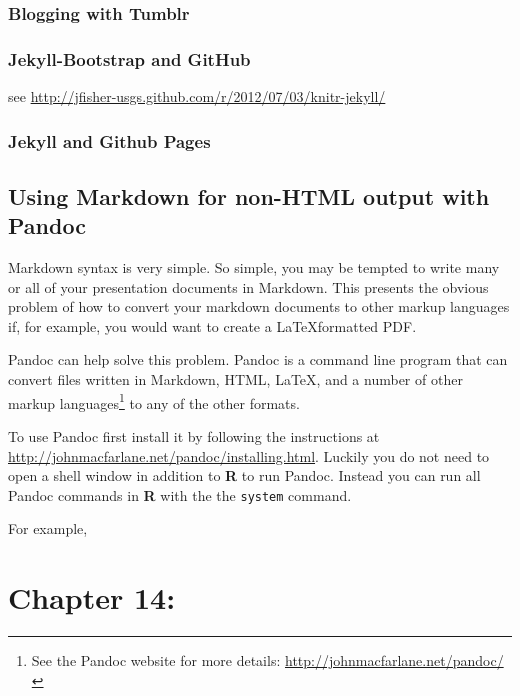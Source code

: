 \documentclass[ChapterTOCs,krantz1]{krantz}\usepackage{graphicx, color}
\begin{document}
\subsection{Blogging with Tumblr}

\subsection{Jekyll-Bootstrap and GitHub}

see \url{http://jfisher-usgs.github.com/r/2012/07/03/knitr-jekyll/}

\subsection{Jekyll and Github Pages}

\section{Using Markdown for non-HTML output with Pandoc}

Markdown syntax is very simple. So simple, you may be tempted to write many or all of your presentation documents in Markdown. This presents the obvious problem of how to convert your markdown documents to other markup languages if, for example, you would want to create a \LaTeX formatted PDF. 

Pandoc can help solve this problem. Pandoc is a command line program that can convert files written in Markdown, HTML, \LaTeX, and a number of other markup languages\footnote{See the Pandoc website for more details: {\url{http://johnmacfarlane.net/pandoc/}}} to any of the other formats. 

To use Pandoc first install it by following the instructions at {\url{http://johnmacfarlane.net/pandoc/installing.html}}. Luckily you do not need to open a shell window in addition to {\bf{R}} to run Pandoc. Instead you can run all Pandoc commands in {\bf{R}} with the the {\tt{system}} command. 

For example, 


  




\chapter{Chapter 14:}






\clearpage
\printindex
\end{document}
